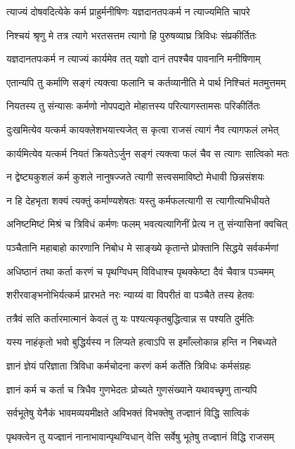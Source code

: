\twolineshloka
{त्याज्यं दोषवदित्येके कर्म प्राहुर्मनीषिणः}
{यज्ञदानतपःकर्म न त्याज्यमिति चापरे}


\twolineshloka
{निश्चयं श्रृणु मे तत्र त्यागे भरतसत्तम}
{त्यागो हि पुरुषव्याघ्र त्रिविधः संप्रकीर्तितः}


\twolineshloka
{यज्ञदानतपःकर्म न त्याज्यं कार्यमेव तत्}
{यज्ञो दानं तपश्चैव पावनानि मनीषिणाम्}


\twolineshloka
{एतान्यपि तु कर्माणि सङ्गं त्यक्त्वा फलानि च}
{कर्तव्यानीति मे पार्थ निश्चितं मतमुत्तमम्}


\twolineshloka
{नियतस्य तु संन्यासः कर्मणो नोपपद्यते}
{मोहात्तस्य परित्यागस्तामसः परिकीर्तितः}


\twolineshloka
{दुःखमित्येव यत्कर्म कायक्लेशभयात्त्यजेत्}
{स कृत्वा राजसं त्यागं नैव त्यागफलं लभेत्}


\twolineshloka
{कार्यमित्येव यत्कर्म नियतं क्रियतेऽर्जुन}
{सङ्गं त्यक्त्वा फलं चैव स त्यागः सात्विको मतः}


\twolineshloka
{न द्वेष्ट्यकुशलं कर्म कुशले नानुषज्जते}
{त्यागी सत्त्वसमाविष्टो मेधावी छिन्नसंशयः}


\twolineshloka
{न हि देहभृता शक्यं त्यक्तुं कर्माण्यशेषतः}
{यस्तु कर्मफलत्यागी स त्यागीत्यभिधीयते}


\twolineshloka
{अनिष्टमिष्टं मिश्रं च त्रिविधं कर्मणः फलम्}
{भवत्यत्यागिनीं प्रेत्य न तु संन्यासिनां क्वचित्}


\twolineshloka
{पञ्चैतानि महाबाहो कारणानि निबोध मे}
{साङ्ख्ये कृतान्ते प्रोक्तानि सिद्धये सर्वकर्मणां}


\twolineshloka
{अधिष्ठानं तथा कर्ता करणं च पृथग्विधम्}
{विविधाश्च पृथक्केष्टा दैवं चैवात्र पञ्चमम्}


\twolineshloka
{शरीरवाङ्भनोभिर्यत्कर्म प्रारभते नरः}
{न्याय्यं वा विपरीतं वा पञ्चैते तस्य हेतवः}


\twolineshloka
{तत्रैवं सति कर्तारमात्मानं केवलं तु यः}
{पश्यत्यकृतबुद्धित्वान्न स पश्यति दुर्मतिः}


\twolineshloka
{यस्य नाहंकृतो भवो बुद्धिर्यस्य न लिप्यते}
{हत्वाऽपि स इमाँल्लोकान्न हन्ति न निबध्यते}


\twolineshloka
{ज्ञानं ज्ञेयं परिज्ञाता त्रिविधा कर्मचोदना}
{करणं कर्म कर्तेति त्रिविधः कर्मसंग्रहः}


\twolineshloka
{ज्ञानं कर्म च कर्ता च त्रिधैव गुणभेदतः}
{प्रोच्यते गुणसंख्याने यथावच्छृणु तान्यपि}


\twolineshloka
{सर्वभूतेषु येनैकं भावमव्ययमीक्षते}
{अविभक्तं विभक्तेषु तज्ज्ञानं विद्धि सात्विकं}


\twolineshloka
{पृथक्त्वेन तु यज्ज्ञानं नानाभावान्पृथग्विधान्}
{वेत्ति सर्वेषु भूतेषु तज्ज्ञानं विद्धि राजसम्}


